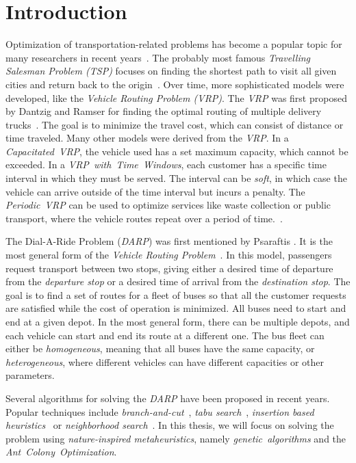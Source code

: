 \chapter*{Introduction}

Optimization of transportation-related problems has become a popular topic for many researchers in recent years~\cite{surveytransport}. The probably most famous \textit{Travelling Salesman Problem (TSP)} focuses on finding the shortest path to visit all given cities and return back to the origin~\cite{surveytsp}. Over time, more sophisticated models were developed, like the \textit{Vehicle Routing Problem (VRP)}. The \textit{VRP} was first proposed by Dantzig and Ramser for finding the optimal routing of multiple delivery trucks~\cite{Dantzig1959TheTD}. The goal is to minimize the travel cost, which can consist of distance or time traveled. Many other models were derived from the \textit{VRP}. In a \textit{Capacitated~VRP}, the vehicle used has a set maximum capacity, which cannot be exceeded. In a  \textit{VRP~with~Time~Windows}, each customer has a specific time interval in which they must be served. The interval can be \textit{soft}, in which case the vehicle can arrive outside of the time interval but incurs a penalty. The \textit{Periodic~VRP} can be used to optimize services like waste collection or public transport, where the vehicle routes repeat over a period of time.~\cite{VRPSurvey}.

The Dial-A-Ride Problem (\textit{DARP}) was first mentioned by Psaraftis \cite{psaraftis1980dynamic}. It is the most general form of the \textit{Vehicle Routing Problem}~\cite{darpmunk}. In this model, passengers request transport between two stops, giving either a desired time of departure from the \textit{departure stop} or a desired time of arrival from the \textit{destination stop}. The goal is to find a set of routes for a fleet of buses so that all the customer requests are satisfied while the cost of operation is minimized. All buses need to start and end at a given depot. In the most general form, there can be multiple depots, and each vehicle can start and end its route at a different one. The bus fleet can either be \textit{homogeneous}, meaning that all buses have the same capacity, or \textit{heterogeneous}, where different vehicles can have different capacities or other parameters.

Several algorithms for solving the \textit{DARP} have been proposed in recent years. Popular techniques include \textit{branch-and-cut}~\cite{branchandcutcordeau}, \textit{tabu search}~\cite{tabucordeau}, \textit{insertion based heuristics}~\cite{insertionjaw} or \textit{neighborhood search}~\cite{neighbourhoodparragh}. In this thesis, we will focus on solving the problem using \textit{nature-inspired metaheuristics}, namely \textit{genetic~algorithms} and the \textit{Ant~Colony~Optimization}.

